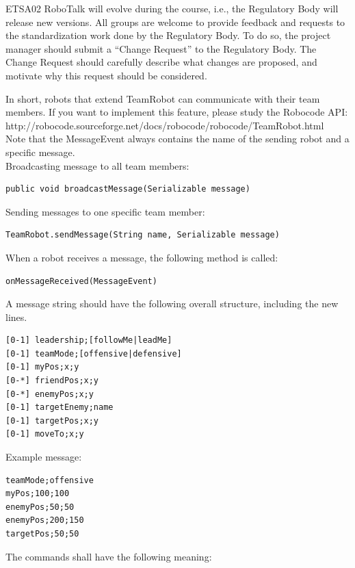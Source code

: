 \documentclass{scrreprt}
\begin{document}
ETSA02 RoboTalk will evolve during the course, i.e., the Regulatory Body will release new versions. All groups are welcome to provide feedback and requests to the standardization work done by the Regulatory Body. To do so, the project manager should submit a ``Change Request'' to the Regulatory Body. The Change Request should carefully describe what changes are proposed, and motivate why this request should be considered.

In short, robots that extend TeamRobot can communicate with their team members. If you want to implement this feature, please study the Robocode API:\\http://robocode.sourceforge.net/docs/robocode/robocode/TeamRobot.html\\Note that the MessageEvent always contains the name of the sending robot and a specific message.\\

Broadcasting message to all team members:
\begin{verbatim}
public void broadcastMessage(Serializable message)
\end{verbatim}

Sending messages to one specific team member:
\begin{verbatim}
TeamRobot.sendMessage(String name, Serializable message)
\end{verbatim}

When a robot receives a message, the following method is called:
\begin{verbatim}
onMessageReceived(MessageEvent)
\end{verbatim}

A message string should have the following overall structure, including the new lines.

\begin{verbatim}
[0-1] leadership;[followMe|leadMe]
[0-1] teamMode;[offensive|defensive]
[0-1] myPos;x;y
[0-*] friendPos;x;y
[0-*] enemyPos;x;y
[0-1] targetEnemy;name
[0-1] targetPos;x;y
[0-1] moveTo;x;y
\end{verbatim}

Example message:

\begin{verbatim}
teamMode;offensive
myPos;100;100
enemyPos;50;50
enemyPos;200;150
targetPos;50;50
\end{verbatim}

The commands shall have the following meaning:
\end{document}
